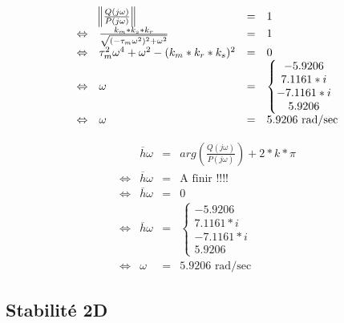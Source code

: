 \begin{minipage}{.48\textwidth}
\begin{equation}
\begin{array}{rlcl}
&\norm{\frac{Q(j\omega)}{P(j\omega)}} &=& 1 \\
\Leftrightarrow & \frac{k_m*k_s*k_r}{ \sqrt{(-\tau_m \omega^2)^2 + \omega^2}} &=& 1\\
\Leftrightarrow & \tau_m^2 \omega^4 + \omega^2 -(k_m*k_r*k_s)^2 &=& 0\\
\Leftrightarrow & \omega &=& \left\lbrace\begin{matrix}
-5.9206 \\
7.1161*i\\
- 7.1161*i\\
5.9206
\end{matrix}\right.\\
\Leftrightarrow & \omega &=& 5.9206 \text{ rad/sec}
\end{array}
\end{equation}
\end{minipage} \vline 
\begin{minipage}{.48\textwidth}
\begin{equation}
\begin{array}{rlcl}
&\overline{h}\omega &=& arg\left(\frac{Q(j\omega)}{P(j\omega)}\right) + 2*k*\pi\\
\Leftrightarrow & \overline{h}\omega  &=& \text{A finir !!!! }\\
\Leftrightarrow & \overline{h}\omega &=& 0\\
\Leftrightarrow & \overline{h}\omega  &=& \left\lbrace\begin{matrix}
-5.9206 \\
7.1161*i\\
- 7.1161*i\\
5.9206
\end{matrix}\right.\\
\Leftrightarrow & \omega &=& 5.9206 \text{ rad/sec}
\end{array}
\end{equation}
\end{minipage}

		\subsection{Stabilité 2D}



